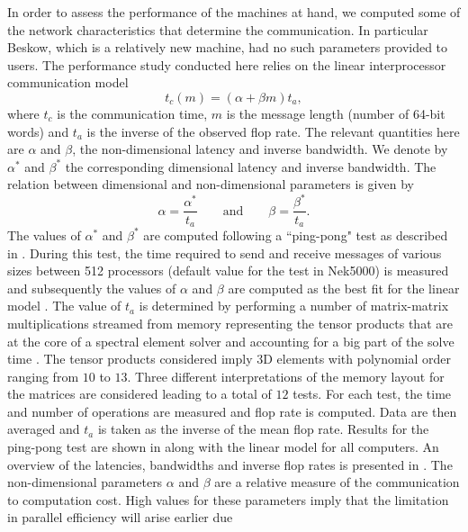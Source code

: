 \documentclass{sig-alternate}
\begin{document}
In order to assess the performance of the machines at hand, we computed  some of the network characteristics that determine the communication. In particular Beskow, which is a relatively new machine, had no such parameters provided to users. 
The performance study conducted here relies on the linear interprocessor communication  model
\begin{equation}
 t_c(m) = (\alpha + \beta m) t_a,\label{eqn:lincomm}
\end{equation}
where $t_c$ is the communication time, $m$ is the message length (number of
64-bit words) and $t_a$ is the inverse of the observed flop rate. The relevant
quantities here are $\alpha$ and $\beta$, the non-dimensional latency and inverse
 bandwidth. We denote by $\alpha^*$ and $\beta^*$ the corresponding dimensional 
latency and inverse bandwidth. The relation between dimensional and non-dimensional parameters is given by
\begin{equation*}
\alpha = \frac{\alpha^*}{t_a} \qquad \text{and} \qquad \beta = \frac{\beta^*}{t_a}.
\end{equation*}
The values of $\alpha^*$ and $\beta^*$ are computed following a ``ping-pong" test 
as described in \cite{fischer:scaling}. During this test, the time required to 
send and receive messages of various sizes between 512 processors (default value
for the test in Nek5000) is measured 
and subsequently the values of $\alpha$ and $\beta$ are computed as the best fit 
for the linear model . The value of $t_a$ is determined by 
performing a number of matrix-matrix multiplications streamed from memory
representing the tensor products that are at the core of a spectral element 
solver \cite{fischer:hom} and accounting for a big part of the solve time 
\cite{Max2016}. The tensor products considered imply 3D elements with polynomial 
order ranging from $10$ to $13$. Three different interpretations of the memory 
layout for the matrices are considered 
leading to a total of $12$ tests. For each test, the time and number of operations are
measured and flop rate is computed. Data are then averaged and $t_a$ is taken as the
inverse of the mean flop rate. Results for the ping-pong test are shown in 
 along with the linear model for all computers. An overview 
of the latencies, bandwidths and inverse flop rates is presented in 
. The non-dimensional parameters $\alpha$ and $\beta$ are 
a relative measure of the communication to computation cost. High values for these
parameters imply that the limitation in parallel efficiency will arise earlier due 
\end{document}
